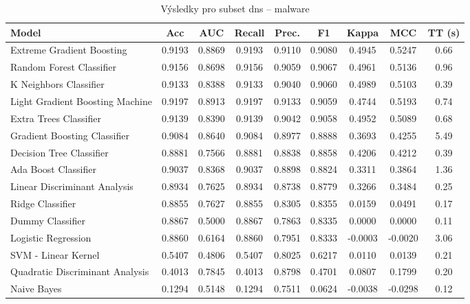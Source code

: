 \begin{table}[H]
  \centering
  \small
  \caption{Výsledky pro subset dns – malware}
  \begin{tabular}{|l|c|c|c|c|c|c|c|c|}
    \hline
    \textbf{Model} & \textbf{Acc} & \textbf{AUC} & \textbf{Recall} & \textbf{Prec.} & \textbf{F1} & \textbf{Kappa} & \textbf{MCC} & \textbf{TT (s)} \\
    \hline
    Extreme Gradient Boosting & 0.9193 & 0.8869 & 0.9193 & 0.9110 & 0.9080 & 0.4945 & 0.5247 & 0.66 \\
    Random Forest Classifier & 0.9156 & 0.8698 & 0.9156 & 0.9059 & 0.9067 & 0.4961 & 0.5136 & 0.96 \\
    K Neighbors Classifier & 0.9133 & 0.8388 & 0.9133 & 0.9040 & 0.9060 & 0.4989 & 0.5103 & 0.39 \\
    Light Gradient Boosting Machine & 0.9197 & 0.8913 & 0.9197 & 0.9133 & 0.9059 & 0.4744 & 0.5193 & 0.74 \\
    Extra Trees Classifier & 0.9139 & 0.8390 & 0.9139 & 0.9042 & 0.9058 & 0.4952 & 0.5089 & 0.68 \\
    Gradient Boosting Classifier & 0.9084 & 0.8640 & 0.9084 & 0.8977 & 0.8888 & 0.3693 & 0.4255 & 5.49 \\
    Decision Tree Classifier & 0.8881 & 0.7566 & 0.8881 & 0.8838 & 0.8858 & 0.4206 & 0.4212 & 0.39 \\
    Ada Boost Classifier & 0.9037 & 0.8368 & 0.9037 & 0.8898 & 0.8824 & 0.3311 & 0.3864 & 1.36 \\
    Linear Discriminant Analysis & 0.8934 & 0.7625 & 0.8934 & 0.8738 & 0.8779 & 0.3266 & 0.3484 & 0.25 \\
    Ridge Classifier & 0.8855 & 0.7627 & 0.8855 & 0.8305 & 0.8355 & 0.0159 & 0.0491 & 0.17 \\
    Dummy Classifier & 0.8867 & 0.5000 & 0.8867 & 0.7863 & 0.8335 & 0.0000 & 0.0000 & 0.11 \\
    Logistic Regression & 0.8860 & 0.6164 & 0.8860 & 0.7951 & 0.8333 & -0.0003 & -0.0020 & 3.06 \\
    SVM - Linear Kernel & 0.5407 & 0.4806 & 0.5407 & 0.8025 & 0.6217 & 0.0110 & 0.0139 & 0.21 \\
    Quadratic Discriminant Analysis & 0.4013 & 0.7845 & 0.4013 & 0.8798 & 0.4701 & 0.0807 & 0.1799 & 0.20 \\
    Naive Bayes & 0.1294 & 0.5148 & 0.1294 & 0.7511 & 0.0624 & -0.0038 & -0.0298 & 0.12 \\
    \hline
  \end{tabular}
\end{table}
\vspace{0.5cm}

